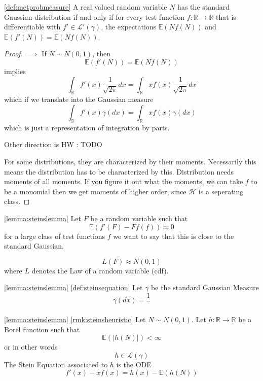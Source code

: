 \begin{lemma}
  \label{lemma:steinslemma}
  \ref{def:metprobmeasure}
  A real valued random variable $N$ has the standard Gaussian distribution if and only if for every test function 
  $f : \mathbb{R} \to \mathbb{R}$ that is differentiable with $f' \in \mathcal{L}'(\gamma)$, the expectations 
  $\mathbb{E}(Nf(N))$ and $\mathbb{E}(f'(N)) = \mathbb{E}(Nf(N))$.
\end{lemma}

\begin{proof}
  $\implies$
  If $N \sim N(0,1)$, then 
  \[
    \mathbb{E}(f'(N)) = \mathbb{E}(Nf(N))
  \]
  implies 
  \[
    \int_\mathbb{R} f'(x) \frac{1}{\sqrt{2\pi}}dx = \int_\mathbb{R} x f(x) \frac{1}{\sqrt{2\pi}}dx 
  \]
  which if we translate into the Gaussian measure 
  \[
    \int_\mathbb{R} f'(x) \gamma(dx) = \int_\mathbb{R} xf(x) \gamma(dx)
  \]
  which is just a representation of integration by parts.

  Other direction is HW : TODO

  For some distributions, they are characterized by their moments. Necessarily this means the distribution has to be characterized by this. 
  Distribution needs moments of all moments. If you figure it out what the moments, we can take $f$ to be a monomial then we get moments of higher order, since $\mathcal{H}$ is a seperating class.
\end{proof}

\begin{remark}
  \label{rmk:steinsheuristic}
  \ref{lemma:steinslemma}
  Let $F$ be a random variable such that 
  \[
    \mathbb{E}(f'(F)-Ff(f)) \approx 0
  \]
  for a large class of test functions $f$ we want to say that this is close to the standard Gaussian.

  \[
    L(F) \approx N(0,1)
  \]
where $L$ denotes the Law of a random variable (cdf).
\end{remark}
\begin{theorem}
  \label{thm:steins}
  \ref{lemma:steinslemma}
  \ref{def:steinsequation}
  Let $\gamma$ be the standard Gaussian Measure 
  \[
    \gamma(dx) = \frac{1}{}
  \]
\end{theorem}

\begin{definition}
  \label{def:steinsequation}
  \ref{lemma:steinslemma}
  \ref{rmk:steinsheuristic}
  Let $N \sim N(0,1)$. Let $h : \mathbb{R} \to \mathbb{R}$ be a Borel function such that 
  \[
    \mathbb{E}(|h(N)|) < \infty 
  \]
  or in other words 
  \[
    h \in \mathcal{L}(\gamma)
  \]
  The Stein Equation associated to $h$ is the ODE 
  \[
    f'(x) -xf(x) = h(x) - \mathbb{E}(h(N))
  \]
\end{definition}

